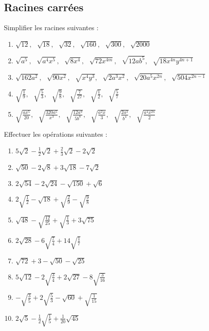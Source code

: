 \subsection{Racines carrées}
\begin{exercice}
Simplifier les racines suivantes :
\begin{enumerate}
\item $\sqrt{12},\text{  }\sqrt{18},\text{  }\sqrt{32},\text{  }\sqrt{160},\text{  }\sqrt{300},\text{  }\sqrt{2000}$
\item $\sqrt{{{a}^{5}}},\text{  }\sqrt{{{a}^{4}}{{x}^{5}}},\text{  }\sqrt{8{{x}^{4}}},\text{  }\sqrt{72{{x}^{4m}}},\text{  }\sqrt{12a{{b}^{5}}},\text{  }\sqrt{18{{x}^{4n}}{{y}^{4n+1}}}$
\item $\sqrt{162{{a}^{2}}},\text{  }\sqrt{90{{x}^{2}}},\text{  }\sqrt{{{x}^{4}}{{y}^{3}}},\text{  }\sqrt{2{{a}^{3}}{{x}^{2}}},\text{  }\sqrt{20{{a}^{5}}{{x}^{2n}}},\text{  }\sqrt{504{{x}^{2n-1}}}$
\item $\sqrt{\frac{1}{9}},\text{  }\sqrt{\frac{5}{3}},\text{  }\sqrt{\frac{9}{8}},\text{  }\sqrt{\frac{7}{27}},\text{  }\sqrt{\frac{1}{2}},\text{  }\sqrt{\frac{5}{7}}$
\item $\sqrt{\frac{a{{x}^{5}}}{20}},\text{  }\sqrt{\frac{320{{a}^{5}}}{{{x}^{3}}}},\text{  }\sqrt{\frac{12{{a}^{9}}}{5{{b}^{8}}}},\text{  }\sqrt{\frac{{{a}^{2}}x}{3}},\text{ }\sqrt{\frac{2{{a}^{3}}}{{{b}^{4}}}},\text{  }\sqrt{\frac{{{a}^{4}}{{x}^{2n}}}{2}}$
\end{enumerate}
\end{exercice}

\begin{exercice}
Effectuer les opérations suivantes :
\begin{multicols}{2}
\begin{enumerate}
\item $5\sqrt{2}-\frac{1}{2}\sqrt{2}+\frac{2}{3}\sqrt{2}-2\sqrt{2}$ 
\item $\sqrt{50}-2\sqrt{8}+3\sqrt{18}-7\sqrt{2}$ 
\item $2\sqrt{54}-2\sqrt{24}-\sqrt{150}+\sqrt{6}$ 
\item $2\sqrt{\frac{1}{2}}-\sqrt{18}+\sqrt{\frac{2}{9}}-\sqrt{\frac{9}{8}}$ 
\item $\sqrt{48}-\sqrt{\frac{12}{25}}+\sqrt{\frac{1}{3}}+3\sqrt{75}$
\item $2\sqrt{28}-6\sqrt{\frac{7}{4}}+14\sqrt{\frac{1}{7}}$
\item $\sqrt{72}+3-\sqrt{50}-\sqrt{25}$
\item $5\sqrt{12}-2\sqrt{\frac{3}{4}}+2\sqrt{27}-8\sqrt{\frac{3}{16}}$
\item $-\sqrt{\frac{3}{5}}+2\sqrt{\frac{5}{3}}-\sqrt{60}+\sqrt{\frac{1}{15}}$
\item $2\sqrt{5}-\frac{1}{2}\sqrt{\frac{1}{5}}+\frac{1}{20}\sqrt{45}$
\end{enumerate}
\end{multicols}
\end{exercice}

